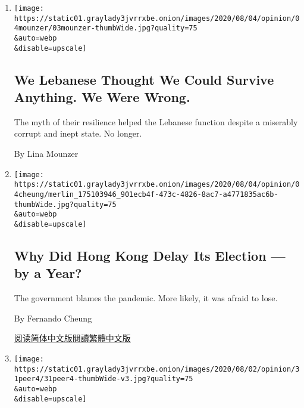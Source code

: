 \begin{enumerate}
\def\labelenumi{\arabic{enumi}.}
\item
  \href{/2020/08/03/opinion/lebanon-coronavirus-economy.html}{}

  \texttt{[image: https://static01.graylady3jvrrxbe.onion/images/2020/08/04/opinion/04mounzer/03mounzer-thumbWide.jpg?quality=75\\\&auto=webp\\\&disable=upscale]}

  \hypertarget{we-lebanese-thought-we-could-survive-anything-we-were-wrong}{%
  \subsection{We Lebanese Thought We Could Survive Anything. We Were
  Wrong.}\label{we-lebanese-thought-we-could-survive-anything-we-were-wrong}}

  The myth of their resilience helped the Lebanese function despite a
  miserably corrupt and inept state. No longer.

  By Lina Mounzer
\item
  \href{/2020/08/02/opinion/hong-kong-election-china.html}{}

  \texttt{[image: https://static01.graylady3jvrrxbe.onion/images/2020/08/04/opinion/04cheung/merlin\_175103946\_901ecb4f-473c-4826-8ac7-a4771835ac6b-thumbWide.jpg?quality=75\\\&auto=webp\\\&disable=upscale]}

  \hypertarget{why-did-hong-kong-delay-its-election--by-a-year}{%
  \subsection{Why Did Hong Kong Delay Its Election --- by a
  Year?}\label{why-did-hong-kong-delay-its-election--by-a-year}}

  The government blames the pandemic. More likely, it was afraid to
  lose.

  By Fernando Cheung

  \href{https://cn.nytimes3xbfgragh.onion/opinion/20200803/hong-kong-election-china/}{阅读简体中文版}\href{https://cn.nytimes3xbfgragh.onion/opinion/20200803/hong-kong-election-china/zh-hant/}{閱讀繁體中文版}
\item
  \href{/2020/07/31/opinion/sunday/India-migration-coronavirus.html}{}

  \texttt{[image: https://static01.graylady3jvrrxbe.onion/images/2020/08/02/opinion/31peer4/31peer4-thumbWide-v3.jpg?quality=75\\\&auto=webp\\\&disable=upscale]}

  \hypertarget{a-friendship-a-pandemic-and-a-death-beside-the-highway}{%
}
\end{enumerate}
